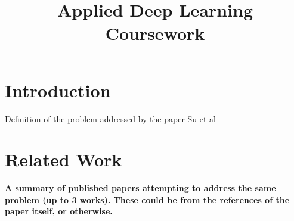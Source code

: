 \documentclass[conference]{IEEEtran}
\begin{document}
\title{Applied Deep Learning Coursework}

\author{
\and
{}
\and
{}

}

\maketitle


\section{Introduction}
Definition of the problem addressed by the paper Su et al

\section{Related Work}
\textbf{A summary of published papers attempting to address the same problem (up to 3 works). These could be from the references of the paper itself, or otherwise.}\\
\end{document}
